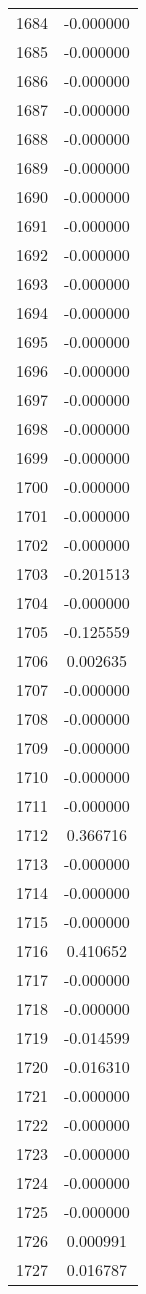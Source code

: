 \documentclass[12pt]{article}
\begin{document}
\begin{longtable}{@{}cc@{}}
1684 & -0.000000 \\
1685 & -0.000000 \\
1686 & -0.000000 \\
1687 & -0.000000 \\
1688 & -0.000000 \\
1689 & -0.000000 \\
1690 & -0.000000 \\
1691 & -0.000000 \\
1692 & -0.000000 \\
1693 & -0.000000 \\
1694 & -0.000000 \\
1695 & -0.000000 \\
1696 & -0.000000 \\
1697 & -0.000000 \\
1698 & -0.000000 \\
1699 & -0.000000 \\
1700 & -0.000000 \\
1701 & -0.000000 \\
1702 & -0.000000 \\
1703 & -0.201513 \\
1704 & -0.000000 \\
1705 & -0.125559 \\
1706 & 0.002635 \\
1707 & -0.000000 \\
1708 & -0.000000 \\
1709 & -0.000000 \\
1710 & -0.000000 \\
1711 & -0.000000 \\
1712 & 0.366716 \\
1713 & -0.000000 \\
1714 & -0.000000 \\
1715 & -0.000000 \\
1716 & 0.410652 \\
1717 & -0.000000 \\
1718 & -0.000000 \\
1719 & -0.014599 \\
1720 & -0.016310 \\
1721 & -0.000000 \\
1722 & -0.000000 \\
1723 & -0.000000 \\
1724 & -0.000000 \\
1725 & -0.000000 \\
1726 & 0.000991 \\
1727 & 0.016787 \\

\end{longtable}
\end{document}
